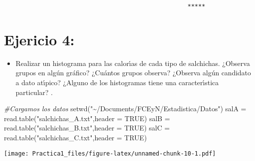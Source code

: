 \documentclass[
]{article}
\newenvironment{Shaded}{\begin{snugshade}}{\end{snugshade}}
\newcommand{\AttributeTok}[1]{\textcolor[rgb]{0.77,0.63,0.00}{#1}}
\newcommand{\CommentTok}[1]{\textcolor[rgb]{0.56,0.35,0.01}{\textit{#1}}}
\newcommand{\ConstantTok}[1]{\textcolor[rgb]{0.00,0.00,0.00}{#1}}
\newcommand{\FunctionTok}[1]{\textcolor[rgb]{0.00,0.00,0.00}{#1}}
\newcommand{\NormalTok}[1]{#1}
\newcommand{\OtherTok}[1]{\textcolor[rgb]{0.56,0.35,0.01}{#1}}
\newcommand{\SpecialCharTok}[1]{\textcolor[rgb]{0.00,0.00,0.00}{#1}}
\newcommand{\StringTok}[1]{\textcolor[rgb]{0.31,0.60,0.02}{#1}}
\providecommand{\tightlist}{%
  \setlength{\itemsep}{0pt}\setlength{\parskip}{0pt}}
\begin{document}
\begin{verbatim}
                                                    *****
\end{verbatim}

\hypertarget{ejericio-4}{%
\section{Ejericio 4:}\label{ejericio-4}}

\begin{itemize}
\tightlist
\item
  Realizar un histograma para las calorı́as de cada tipo de salchichas.
  ¿Observa grupos en algún gráfico? ¿Cuántos grupos observa? ¿Observa
  algún candidato a dato atı́pico? ¿Alguno de los histogramas tiene una
  caracterı́stica particular? .
\end{itemize}

\begin{Shaded}
\begin{Highlighting}[]
\CommentTok{\#Cargamos los datos}
\FunctionTok{setwd}\NormalTok{(}\StringTok{"\textasciitilde{}/Documents/FCEyN/Estadistica/Datos"}\NormalTok{)}
\NormalTok{salA }\OtherTok{=} \FunctionTok{read.table}\NormalTok{(}\StringTok{"salchichas\_A.txt"}\NormalTok{,}\AttributeTok{header =} \ConstantTok{TRUE}\NormalTok{)}
\NormalTok{salB }\OtherTok{=} \FunctionTok{read.table}\NormalTok{(}\StringTok{"salchichas\_B.txt"}\NormalTok{,}\AttributeTok{header =} \ConstantTok{TRUE}\NormalTok{)}
\NormalTok{salC }\OtherTok{=} \FunctionTok{read.table}\NormalTok{(}\StringTok{"salchichas\_C.txt"}\NormalTok{,}\AttributeTok{header =} \ConstantTok{TRUE}\NormalTok{)}
\end{Highlighting}
\end{Shaded}

\begin{Shaded}
\end{Shaded}

\texttt{[image: Practica1\_files/figure-latex/unnamed-chunk-10-1.pdf]}

\begin{Shaded}
\end{Shaded}
\end{document}
